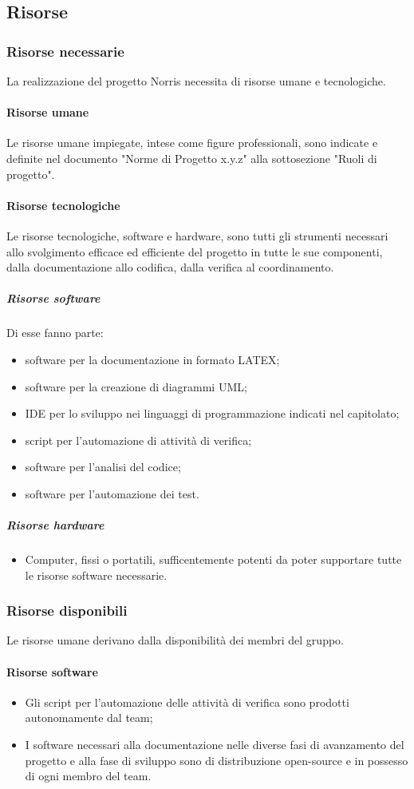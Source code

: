 	\subsection{Risorse}
	\subsubsection{Risorse necessarie}
	La realizzazione del progetto Norris necessita di risorse umane e tecnologiche.
	\paragraph{Risorse umane}
		Le risorse umane impiegate, intese come figure professionali, sono indicate e definite nel documento "Norme di Progetto x.y.z" alla sottosezione "Ruoli di progetto".
	\paragraph{Risorse tecnologiche}
		Le risorse tecnologiche, software e hardware, sono tutti gli strumenti necessari allo svolgimento efficace ed efficiente del progetto in tutte le sue componenti, dalla documentazione allo codifica, dalla verifica al coordinamento.
		\subparagraph{Risorse software}
		Di esse fanno parte:
			\begin{itemize}
				\item software per la documentazione in formato LATEX;
				\item software per la creazione di diagrammi UML;
				\item IDE per lo sviluppo nei linguaggi di programmazione indicati nel capitolato;
				\item script per l'automazione di attività di verifica;
				\item software per l'analisi del codice;
				\item software per l'automazione dei test.
			\end{itemize}
		\subparagraph{Risorse hardware}
			\begin{itemize}
				\item Computer, fissi o portatili, sufficentemente potenti da poter supportare tutte le risorse software necessarie.
			\end{itemize}
	\subsubsection{Risorse disponibili}
	Le risorse umane derivano dalla disponibilità dei membri del gruppo.
	\paragraph{Risorse software}
		\begin{itemize}
			\item Gli script per l'automazione delle attività di verifica sono prodotti autonomamente dal team;
			\item I software necessari alla documentazione nelle diverse fasi di avanzamento  del progetto e alla fase di sviluppo sono di distribuzione open-source e in possesso di ogni membro del team.
		\end{itemize}

